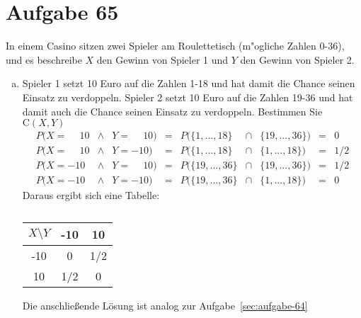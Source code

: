 \section{Aufgabe 65}
\setcounter{section}{65}

In einem Casino sitzen zwei Spieler am Roulettetisch (m"ogliche Zahlen 0-36),
und es beschreibe $X$ den Gewinn von Spieler 1 und $Y$ den Gewinn von Spieler
2.
\begin{enumerate}[(a)]
    \item Spieler 1 setzt 10 Euro auf die Zahlen 1-18 und hat damit die Chance seinen
        Einsatz zu verdoppeln. Spieler 2 setzt 10 Euro auf die Zahlen 19-36 und hat
        damit auch die Chance seinen Einsatz zu verdoppeln. Bestimmen Sie $\text{C}(X, Y)$
        \begin{equation*}
            \begin{array}{lclclcrcl}
                 P(X = \phantom{-} 10 &\land& Y = \phantom{-} 10) &=& P(\{1,...,18\}  &\cap& \{19,...,36\}) &=& 0 \\[5pt]
                 P(X = \phantom{-} 10 &\land& Y =            -10) &=& P(\{1,...,18\}  &\cap& \{1,...,18\})  &=& 1/2 \\[5pt]
                 P(X =            -10 &\land& Y = \phantom{-} 10) &=& P(\{19,...,36\} &\cap& \{19,...,36\}) &=& 1/2 \\[5pt]
                 P(X =            -10 &\land& Y =            -10) &=& P(\{19,...,36\} &\cap& \{1,...,18\})  &=& 0
            \end{array}
        \end{equation*}
        Daraus ergibt sich eine Tabelle:

        \begin{table}[h]
            \centering
            \renewcommand{\arraystretch}{1.5}
            \begin{tabular}{c|c|c}
                $X \setminus Y$ & -10  & 10   \\ \hline
                -10             & 0    & 1/2  \\
                 10             & 1/2  & 0    \\
            \end{tabular}
            \caption{}
        \end{table}

        Die anschließende Lösung ist analog zur Aufgabe~\ref{sec:aufgabe-64}


\end{enumerate}
